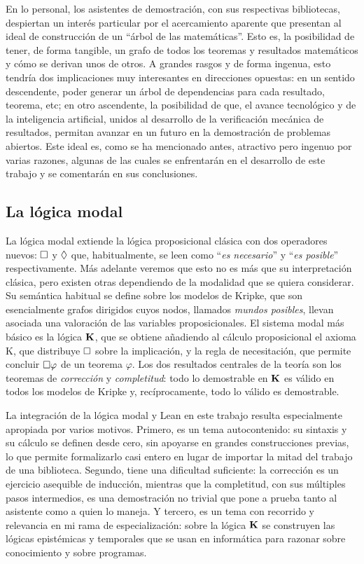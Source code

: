 En lo personal, los asistentes de demostración, con sus respectivas bibliotecas, despiertan un interés particular por el acercamiento aparente que presentan al ideal de construcción de un ``árbol de las matemáticas''. Esto es, la posibilidad de tener, de forma tangible, un grafo de todos los teoremas y resultados matemáticos y cómo se derivan unos de otros. A grandes rasgos y de forma ingenua, esto tendría dos implicaciones muy interesantes en direcciones opuestas: en un sentido descendente, poder generar un árbol de dependencias para cada resultado, teorema, etc; en otro ascendente, la posibilidad de que, el avance tecnológico y de la inteligencia artificial, unidos al desarrollo de la verificación mecánica de resultados, permitan avanzar en un futuro en la demostración de problemas abiertos. Este ideal es, como se ha mencionado antes, atractivo pero ingenuo por varias razones, algunas de las cuales se enfrentarán en el desarrollo de este trabajo y se comentarán en sus conclusiones.

\subsection*{La lógica modal}

La lógica modal extiende la lógica proposicional clásica con dos operadores nuevos: $\square$ y $\lozenge$ que, habitualmente, se leen como ``\emph{es necesario}'' y ``\emph{es posible}'' respectivamente. Más adelante veremos que esto no es más que su interpretación clásica, pero existen otras dependiendo de la modalidad que se quiera considerar. Su semántica habitual se define sobre los modelos de Kripke, que son esencialmente grafos dirigidos cuyos nodos, llamados \emph{mundos posibles}, llevan asociada una valoración de las variables proposicionales. El sistema modal más básico es la lógica $\mathbf{K}$, que se obtiene añadiendo al cálculo proposicional el axioma K, que distribuye $\square$ sobre la implicación, y la regla de necesitación, que permite concluir $\square \varphi$ de un teorema $\varphi$. Los dos resultados centrales de la teoría son los teoremas de \emph{corrección} y \emph{completitud}: todo lo demostrable en $\mathbf{K}$ es válido en todos los modelos de Kripke y, recíprocamente, todo lo válido es demostrable.

La integración de la lógica modal y Lean en este trabajo resulta especialmente apropiada por varios motivos. Primero, es un tema autocontenido: su sintaxis y su cálculo se definen desde cero, sin apoyarse en grandes construcciones previas, lo que permite formalizarlo casi entero en lugar de importar la mitad del trabajo de una biblioteca. Segundo, tiene una dificultad suficiente: la corrección es un ejercicio asequible de inducción, mientras que la completitud, con sus múltiples pasos intermedios, es una demostración no trivial que pone a prueba tanto al asistente como a quien lo maneja. Y tercero, es un tema con recorrido y relevancia en mi rama de especialización: sobre la lógica $\mathbf{K}$ se construyen las lógicas epistémicas y temporales que se usan en informática para razonar sobre conocimiento y sobre programas.

